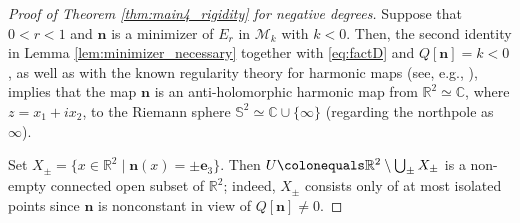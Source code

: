 \documentclass{amsart}
\numberwithin{equation}{section}
\theoremstyle{definition}
\theoremstyle{remark}
\newcommand{\R}{\mathbb{R}}
\renewcommand{\S}{\mathbb{S}}
\newcommand{\C}{\mathbb{C}}
\newcommand{\boM}{\mathcal{M}}
\newcommand{\Om}{\ensuremath{\Omega}}
\newcommand{\ovl}[1]{\overline{#1}}					%
\newcommand{\rd}{{\partial}}								%
\newcommand{\bh}{{\mathbf{h}}}
\newcommand{\bn}{{\mathbf{n}}}
\newcommand{\boe}{{\mathbf{e}}}
\begin{document}
\begin{proof}[Proof of Theorem \ref{thm:main4_rigidity} for negative degrees]
    Suppose that $0<r<1$ and $\bn$ is a minimizer of $E_r$ in $\boM_k$ with $k<0$.
    Then, 
    the second identity in Lemma \ref{lem:minimizer_necessary} together with \eqref{eq:factD} and $Q[\bn]=k< 0$, as well as with the known regularity theory for harmonic maps (see, e.g., \cite[Lemma A.2]{MR728866}), implies that
    the map $\bn$ is an anti-holomorphic harmonic map from $\R^2 \simeq \C$, where $z=x_1+ix_2$, to the Riemann sphere $\S^2\simeq\C\cup\{\infty\}$ (regarding the northpole as $\infty$).
    
    Set $X_\pm = \{x\in\R^2 \mid \bn(x)=\pm \boe_3\}$. 
    Then $U\colonequals \R^2 \setminus \bigcup_{\pm} X_\pm$ is a non-empty connected open subset of $\R^2$; indeed, $X_\pm$ consists only of at most isolated points since $\bn$ is nonconstant in view of $Q[\bn]\neq 0$. 
    
    


\end{proof}
\end{document}
